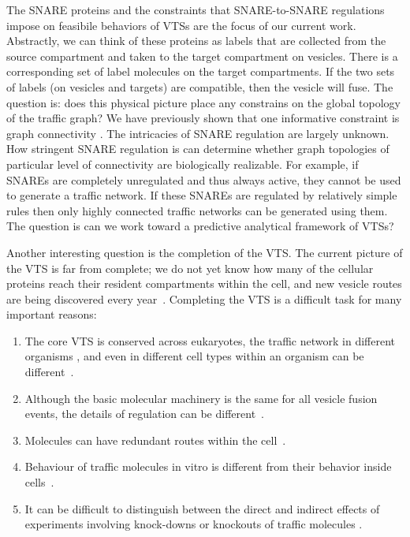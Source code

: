 The SNARE proteins and the constraints that SNARE-to-SNARE regulations
impose on feasibile behaviors of VTSs are the focus of
our current work.
%
Abstractly, we can think of these proteins as labels that are
collected from the source compartment and taken to the target
compartment on vesicles.
%
There is a corresponding set of label molecules on the target compartments.
%
If the two sets of labels (on vesicles and targets) are compatible,
then the vesicle will fuse.
%
The question is: does this physical picture place any constrains on
the global topology of the traffic graph? We have previously shown that one informative constraint is graph connectivity \cite{shukla2017discovering}.
%
The intricacies of SNARE regulation are largely unknown.
%
How stringent SNARE regulation is can determine whether graph
topologies of particular level of connectivity are biologically
realizable.
%
For example, if SNAREs are completely unregulated and thus always
active, they cannot be used to generate a traffic network.
%
If these SNAREs are regulated by relatively simple rules then only
highly connected traffic networks can be generated using them.
%
The question is can we work toward a predictive analytical framework
of VTSs?

Another interesting question is the completion of the VTS. 
%
The current picture of the VTS is far from complete; we do not yet know how many of the cellular proteins reach their resident compartments within the cell, and new vesicle routes are being discovered every year~\cite{nickel2018unconventional,weill2018toolbox}. 
%
Completing the VTS is a difficult task for many important reasons: 
\begin{enumerate}
	\item The core VTS is conserved across eukaryotes, the traffic network in different organisms \cite{richardson2015evolutionary, barlow2017seeing}, and even in different cell types within an organism can be different~\cite{stoops2014trafficking,zhou2015arp2}.
	\item Although the basic molecular machinery is the same for all vesicle fusion events, the details of regulation can be different~\cite{davletov2007regulation,di2010calcium}.
	\item Molecules can have redundant routes within the cell~\cite{shimizu2014compensatory,nakatsukasa2014nutrient}.
	\item Behaviour of traffic molecules in vitro is different from their behavior inside cells~\cite{furukawa2014multiple}. 
	\item It can be difficult to distinguish between the direct and indirect effects of experiments involving knock-downs or knockouts of traffic molecules \cite{hirst2004epsinr,mishev2013small}.
\end{enumerate}

